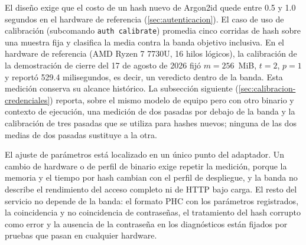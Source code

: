 El diseño exige que el costo de un hash nuevo de Argon2id quede entre 0.5 y 1.0 segundos en el hardware de referencia (\cref{sec:autenticacion}). El caso de uso de calibración (subcomando \texttt{auth calibrate}) promedia cinco corridas de hash sobre una muestra fija y clasifica la media contra la banda objetivo inclusiva. En el hardware de referencia (AMD Ryzen 7 7730U, 16 hilos lógicos), la calibración de la demostración de cierre del 17 de agosto de 2026 fijó $m = 256$~MiB, $t = 2$, $p = 1$ y reportó 529.4 milisegundos, es decir, un veredicto dentro de la banda. Esta medición conserva su alcance histórico. La subsección siguiente (\cref{sec:calibracion-credenciales}) reporta, sobre el mismo modelo de equipo pero con otro binario y contexto de ejecución, una medición de dos pasadas por debajo de la banda y la calibración de tres pasadas que se utiliza para hashes nuevos; ninguna de las dos medias de dos pasadas sustituye a la otra.

El ajuste de parámetros está localizado en un único punto del adaptador. Un cambio de hardware o de perfil de binario exige repetir la medición, porque la memoria y el tiempo por hash cambian con el perfil de despliegue, y la banda no describe el rendimiento del acceso completo ni de HTTP bajo carga. El resto del servicio no depende de la banda: el formato PHC con los parámetros registrados, la coincidencia y no coincidencia de contraseñas, el tratamiento del hash corrupto como error y la ausencia de la contraseña en los diagnósticos están fijados por pruebas que pasan en cualquier hardware.


